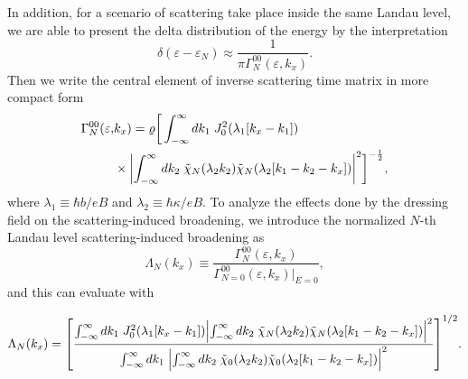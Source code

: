 In addition, for a scenario of scattering take place inside the same Landau level, we are able to present the delta distribution of the energy by the  interpretation \cite{dini16}
\begin{equation} \label{eq_16}
 \delta(\varepsilon - \varepsilon_{N}) \approx
 \frac{1}{\pi \Gamma^{00}_{N}(\varepsilon,k_x)}.
\end{equation}
Then we write the central element of inverse scattering time matrix in more compact form
\begin{equation} \label{eq_17}
  \begin{aligned}
    \Gamma^{00}_{N}(\varepsilon,& k_x) =
    \varrho
    \bigg[
    \int_{-\infty}^{\infty} d {k}_1 \;
    J_0^2\qty(\lambda_1[{k}_x - {k}_1]) \\
    & \times
    \qty|
    \int_{-\infty}^{\infty} d{k}_2 \;
    \tilde{\chi}_{N}\qty(\lambda_2 k_2)
    \tilde{\chi}_{N}\qty(\lambda_2 \qty[{k}_1 - {k}_2 - {k}_x])|^2
    \bigg]^{-\frac{1}{2}},
  \end{aligned}
\end{equation}
where $ \lambda_1 \equiv \hbar b/eB$ and  $\lambda_2 \equiv \hbar \kappa/eB$.
To analyze the effects done by the dressing field on the scattering-induced broadening, we introduce the normalized $N$-th Landau level scattering-induced broadening as
\begin{equation} \label{eq_18}
    \Lambda_N(k_x) \equiv
    \frac{\Gamma^{00}_{N}(\varepsilon,k_x)}{\Gamma^{00}_{N=0}(\varepsilon,k_x)\big|_{E=0}},
\end{equation}
and this can evaluate with
\begin{widetext}
\begin{equation} \label{eq_19}
    \Lambda_N (k_x) =
    \qty[
    \frac
    {\int_{-\infty}^{\infty} d {k}_1 \;
    J_0^2\qty(\lambda_1[{k}_x - {k}_1])
    \qty|
    \int_{-\infty}^{\infty} d{k}_2 \;
    \tilde{\chi}_{N}\qty(\lambda_2 k_2)
    \tilde{\chi}_{N}\qty(\lambda_2 \qty[{k}_1 - {k}_2 - {k}_x])|^2}
    {\int_{-\infty}^{\infty} d {k}_1 \;
    \qty|
    \int_{-\infty}^{\infty} d{k}_2 \;
    \tilde{\chi}_{0}\qty(\lambda_2 k_2)
    \tilde{\chi}_{0}\qty(\lambda_2 \qty[{k}_1 - {k}_2 - {k}_x])|^2}
    ]^{1/2}.
\end{equation}
\end{widetext}

